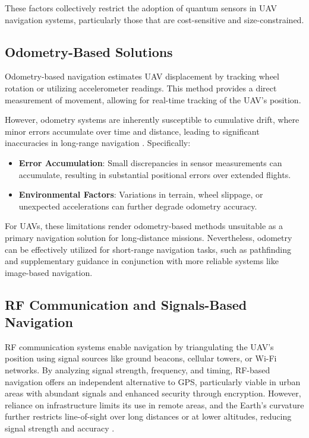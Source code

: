 These factors collectively restrict the adoption of quantum sensors in UAV navigation systems, particularly those that are cost-sensitive and size-constrained.

\subsection{Odometry-Based Solutions}

Odometry-based navigation estimates UAV displacement by tracking wheel rotation or utilizing accelerometer readings. This method provides a direct measurement of movement, allowing for real-time tracking of the UAV's position.

However, odometry systems are inherently susceptible to cumulative drift, where minor errors accumulate over time and distance, leading to significant inaccuracies in long-range navigation \cite{Zhuang2023}. Specifically:

\begin{itemize}
    \item \textbf{Error Accumulation}: Small discrepancies in sensor measurements can accumulate, resulting in substantial positional errors over extended flights.
    \item \textbf{Environmental Factors}: Variations in terrain, wheel slippage, or unexpected accelerations can further degrade odometry accuracy.
\end{itemize}

For UAVs, these limitations render odometry-based methods unsuitable as a primary navigation solution for long-distance missions. Nevertheless, odometry can be effectively utilized for short-range navigation tasks, such as pathfinding and supplementary guidance in conjunction with more reliable systems like image-based navigation.


\subsection{RF Communication and Signals-Based Navigation}

RF communication systems enable navigation by triangulating the UAV’s position using signal sources like ground beacons, cellular towers, or Wi-Fi networks. By analyzing signal strength, frequency, and timing, RF-based navigation offers an independent alternative to GPS, particularly viable in urban areas with abundant signals and enhanced security through encryption. However, reliance on infrastructure limits its use in remote areas, and the Earth's curvature further restricts line-of-sight over long distances or at lower altitudes, reducing signal strength and accuracy \cite{brewer_line_2024}.



